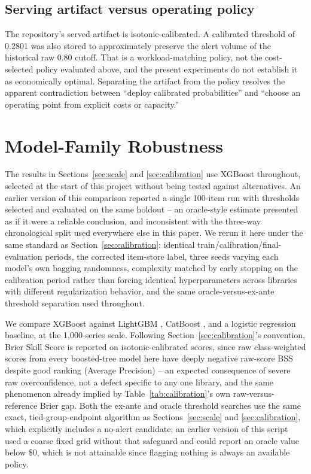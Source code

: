 \documentclass[11pt]{article}
\begin{document}
\subsection{Serving artifact versus operating policy}
\label{sec:deployment}

The repository's served artifact is isotonic-calibrated. A calibrated threshold of 0.2801 was also stored to approximately preserve the alert volume of the historical raw 0.80 cutoff. That is a workload-matching policy, not the cost-selected policy evaluated above, and the present experiments do not establish it as economically optimal. Separating the artifact from the policy resolves the apparent contradiction between ``deploy calibrated probabilities'' and ``choose an operating point from explicit costs or capacity.''

\section{Model-Family Robustness}
\label{sec:modelrobustness}

The results in Sections~\ref{sec:scale} and \ref{sec:calibration} use XGBoost \citep{chen2016xgboost} throughout, selected at the start of this project without being tested against alternatives. An earlier version of this comparison reported a single 100-item run with thresholds selected and evaluated on the same holdout -- an oracle-style estimate presented as if it were a reliable conclusion, and inconsistent with the three-way chronological split used everywhere else in this paper. We rerun it here under the same standard as Section~\ref{sec:calibration}: identical train/calibration/final-evaluation periods, the corrected item-store label, three seeds varying each model's own bagging randomness, complexity matched by early stopping on the calibration period rather than forcing identical hyperparameters across libraries with different regularization behavior, and the same oracle-versus-ex-ante threshold separation used throughout.

We compare XGBoost against LightGBM \citep{ke2017lightgbm}, CatBoost \citep{prokhorenkova2018catboost}, and a logistic regression baseline, at the 1{,}000-series scale. Following Section~\ref{sec:calibration}'s convention, Brier Skill Score is reported on isotonic-calibrated scores, since raw class-weighted scores from every boosted-tree model here have deeply negative raw-score BSS despite good ranking (Average Precision) -- an expected consequence of severe raw overconfidence, not a defect specific to any one library, and the same phenomenon already implied by Table~\ref{tab:calibration}'s own raw-versus-reference Brier gap. Both the ex-ante and oracle threshold searches use the same exact, tied-group-endpoint algorithm as Sections~\ref{sec:scale} and \ref{sec:calibration}, which explicitly includes a no-alert candidate; an earlier version of this script used a coarse fixed grid without that safeguard and could report an oracle value below \$0, which is not attainable since flagging nothing is always an available policy.
\end{document}
